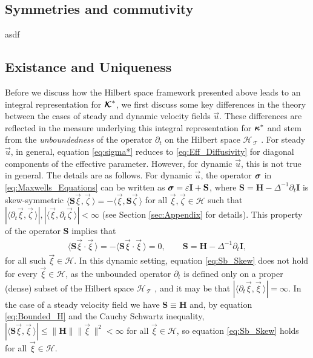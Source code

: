 \documentclass[11pt]{amsart}
\newcommand{\Hb}{\mathbf{H}}
\newcommand{\Ib}{\mathbf{I}}
\newcommand{\Sb}{\mathbf{S}}
\newcommand\Kbc{\mbox{\boldmath${\mathcal{K}}$}}
\newcommand{\Tc}{\mathcal{T}}
\newcommand{\Hs}{\mathscr{H}}
\newcommand\bsig{\mbox{\boldmath${\sigma}$}}
\newcommand\bkappa{\mbox{\boldmath${\kappa}$}}
\begin{document}
\subsection{Symmetries and commutivity}\label{sec:Symmetries_Commute}
%
asdf

\subsection{Existance and Uniqueness}\label{sec:Existance!}
%
Before we discuss how the Hilbert space framework presented above
leads to an  integral representation for $\Kbc^*$, we first discuss
some key differences in the theory between the cases of steady 
and dynamic velocity fields $\vec{u}$. These differences are reflected
in the measure underlying this integral representation for $\bkappa^*$
and stem from the \emph{unboundedness} of the operator $\partial_t$ on the
Hilbert space $\Hs_{\,\Tc}$ \cite{Reed-1980,Stone:64}. For steady
$\vec{u}$, in general, equation \eqref{eq:sigma*} reduces to
\eqref{eq:Eff_Diffusivity} for  diagonal components of the effective
parameter.  However, for dynamic $\vec{u}$, this is not true in
general. The details are as follows. For dynamic $\vec{u}$, the
operator $\bsig$ in \eqref{eq:Maxwells_Equations} can be written as
$\bsig=\varepsilon\Ib+\Sb$, where  $\Sb=\Hb-\Delta^{-1}\partial_t\Ib$ is skew-symmetric 
$\langle\Sb\vec{\xi},\vec{\zeta}\,\rangle=-\langle\vec{\xi},\Sb\vec{\zeta}\,\rangle$ for all
$\vec{\xi},\vec{\zeta}\in\Hs$ such that
$|\langle\partial_t\vec{\xi},\vec{\zeta}\,\rangle|,|\langle\vec{\xi},\partial_t\vec{\zeta}\,\rangle|<\infty$ (see Section
\ref{sec:Appendix} for details).  
This property of the operator $\Sb$ implies that
%
\begin{align}\label{eq:Sb_Skew_2}
  \langle\Sb\vec{\xi}\cdot\vec{\xi}\,\rangle=-\langle\Sb\vec{\xi}\cdot\vec{\xi}\,\rangle=0,
  \qquad
  \Sb=\Hb-\Delta^{-1}\partial_t\Ib,
\end{align}
%
for all such $\vec{\xi}\in\Hs$. In this dynamic setting, equation
\eqref{eq:Sb_Skew} does not hold for every $\vec{\xi}\in\Hs$, as the
unbounded operator $\partial_t$ is defined only on a proper (dense) subset of
the Hilbert space $\Hs_{\,\Tc}$ \cite{Reed-1980}, and it may be that
$|\langle\partial_t\vec{\xi},\vec{\xi}\,\rangle|=\infty$. In the case of a steady velocity field
we have $\Sb\equiv\Hb$ and, by equation \eqref{eq:Bounded_H} and the Cauchy
Schwartz inequality, $|\langle\Sb\vec{\xi},\vec{\xi}\,\rangle|\leq\|\Hb\|\|\vec{\xi}\,\|^2<\infty$ for
all $\vec{\xi}\in\Hs$, so equation \eqref{eq:Sb_Skew} holds for all
$\vec{\xi}\in\Hs$.   
\end{document}
